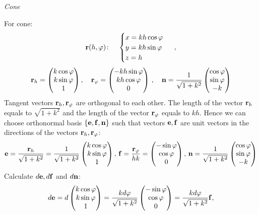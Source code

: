 \documentclass[12pt]{article}
\theoremstyle{theorem}
\numberwithin{equation}{section}
\begin{document}
{\bigskip

{\it Cone}


For  cone:
          $$
  {\bf r}(h,\varphi)\colon\quad
  \begin{cases}
  x=kh\cos\varphi\\
  y=kh\sin\varphi\\
  z=h\\
  \end{cases}\,   \,,
   $$
        $$
        {\bf r}_h=
  \begin{pmatrix}
        k\cos\varphi\cr
        k\sin\varphi\cr
        1\cr
   \end{pmatrix},\quad
  {\bf r}_\varphi=\begin{pmatrix}
        -kh\sin\varphi\cr
        kh\cos\varphi\cr
          0\cr
   \end{pmatrix}\,,\quad
   {\bf n}=
   {1\over {\sqrt {1+k^2}}}
      \begin{pmatrix}
        \cos \varphi\cr
        \sin\varphi\cr
        -k\cr
   \end{pmatrix}
            $$
Tangent vectors  ${\bf r}_h,{\bf r}_\varphi$ are orthogonal to each other.
The length of the vector ${\bf r}_h$ equals to $\sqrt {1+k^2}$ and  the length of the vector ${\bf r}_\varphi$
equals to $kh$.
Hence we can choose orthonormal basis $\{{\bf e},{\bf f},{\bf n}\}$ such that vectors ${\bf e},{\bf f}$ are unit vectors in the
directions of the vectors  ${\bf r}_h,{\bf r}_\varphi$:
               $$
               {\bf e}= {{\bf r}_h\over \sqrt {1+k^2}}=
               {1\over \sqrt {1+k^2}}
  \begin{pmatrix}
        k\cos\varphi\cr
        k\sin\varphi\cr
        1\cr
   \end{pmatrix},\,
  {\bf f}={{\bf r}_\varphi\over hk}=\begin{pmatrix}
        -\sin\varphi\cr
        \cos\varphi\cr
          0\cr
   \end{pmatrix},\,
   {\bf n}=
   {1\over {\sqrt {1+k^2}}}
      \begin{pmatrix}
        \cos \varphi\cr
        \sin\varphi\cr
        -k\cr
   \end{pmatrix}
               $$
Calculate $d{\bf e},d{\bf f}$ and $d{\bf n}$:
           $$
      d{\bf e}=d\begin{pmatrix}
        k\cos\varphi\cr
        k\sin\varphi\cr
        1\cr
   \end{pmatrix}={kd\varphi\over \sqrt{1+k^2}}\begin{pmatrix}
        -\sin\varphi\cr
        \cos\varphi\cr
        0\cr
   \end{pmatrix}={ kd\varphi\over \sqrt{1+k^2}}{\bf f},
           $$
}
\end{document}
